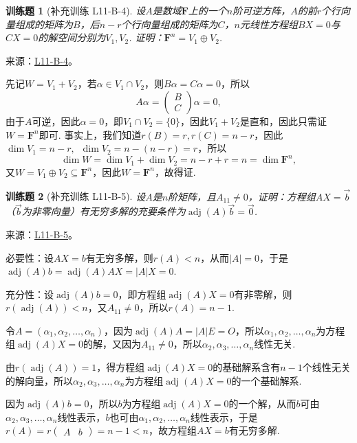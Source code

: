 \documentclass[12pt,fontset=fandol]{ctexart}
\newtheorem{exercise}{训练题}[section]
\begin{document}
\begin{exercise}[补充训练 L11-B-4]\label{prob:L11-B-4}
设$A$是数域$\mathbf{F}$上的一个$n$阶可逆方阵，$A$的前$r$个行向量组成的矩阵为$B$，后$n-r$个行向量组成的矩阵为$C$，$n$元线性方程组$BX=0$与$CX=0$的解空间分别为$V_1,V_2$. 证明：$\mathbf{F}^n=V_1\oplus V_2$.
\end{exercise}
\noindent 来源：\href{https://github.com/yhwu-is/Linear-Algebra-Left-Undone/blob/new/%E8%AE%B2%E4%B9%89/%E4%B8%93%E9%A2%98/11%20%E6%9C%9D%E8%8A%B1%E5%A4%95%E6%8B%BE.tex}{L11-B-4}。
\begin{solve}
先记$W=V_1+V_2$，若$\alpha\in V_1\cap V_2$，则$B\alpha=C\alpha=0$，所以
            \[A\alpha=\begin{pmatrix}
                    B \\
                    C
                \end{pmatrix}\alpha=0,\]
            由于$A$可逆，因此$\alpha=0$，即$V_1\cap V_2=\{0\}$，因此$V_1+V_2$是直和，因此只需证$W=\mathbf{F}^n$即可. 事实上，我们知道$r(B)=r,r(C)=n-r$，因此$\dim V_1=n-r,\enspace \dim V_2=n-(n-r)=r$，所以
            \[\dim W=\dim V_1+\dim V_2=n-r+r=n=\dim \mathbf{F}^n,\]
            又$W=V_1\oplus V_2\subseteq \mathbf{F}^n$，因此$W=\mathbf{F}^n$，故得证.
\end{solve}

\begin{exercise}[补充训练 L11-B-5]\label{prob:L11-B-5}
设$A$是$n$阶矩阵，且$A_{11}\neq 0$，证明：方程组$AX=\vec{b}$（$\vec{b}$为非零向量）有无穷多解的充要条件为$\operatorname{adj}(A)\vec{b}=\vec{0}$.
\end{exercise}
\noindent 来源：\href{https://github.com/yhwu-is/Linear-Algebra-Left-Undone/blob/new/%E8%AE%B2%E4%B9%89/%E4%B8%93%E9%A2%98/11%20%E6%9C%9D%E8%8A%B1%E5%A4%95%E6%8B%BE.tex}{L11-B-5}。
\begin{solve}
必要性：设$AX=b$有无穷多解，则$r(A)<n$，从而$|A|=0$，于是$\operatorname{adj}(A)b=\operatorname{adj}(A)AX=|A|X=0$.

          充分性：设$\operatorname{adj}(A)b=0$，即方程组$\operatorname{adj}(A)X=0$有非零解，则$r(\operatorname{adj}(A))<n$，又$A_{11}\neq 0$，所以$r(A)=n-1$.

          令$A=(\alpha_1,\alpha_2,\ldots,\alpha_n)$，因为$\operatorname{adj}(A)A=|A|E=O$，所以$\alpha_1,\alpha_2,\ldots,\alpha_n$为方程组$\operatorname{adj}(A)X=0$的解，又因为$A_{11}\neq 0$，所以$\alpha_2,\alpha_3,\ldots,\alpha_n$线性无关.

          由$r(\operatorname{adj}(A))=1$，得方程组$\operatorname{adj}(A)X=0$的基础解系含有$n-1$个线性无关的解向量，所以$\alpha_2,\alpha_3,\ldots,\alpha_n$为方程组$\operatorname{adj}(A)X=0$的一个基础解系.

          因为$\operatorname{adj}(A)b=0$，所以$b$为方程组$\operatorname{adj}(A)X=0$的一个解，从而$b$可由$\alpha_2,\alpha_3,\ldots,\alpha_n$线性表示，$b$也可由$\alpha_1,\alpha_2,\ldots,\alpha_n$线性表示，于是$r(A) = r\begin{pmatrix}A & b\end{pmatrix}=n-1<n$，故方程组$AX=b$有无穷多解.
\end{solve}
\end{document}
